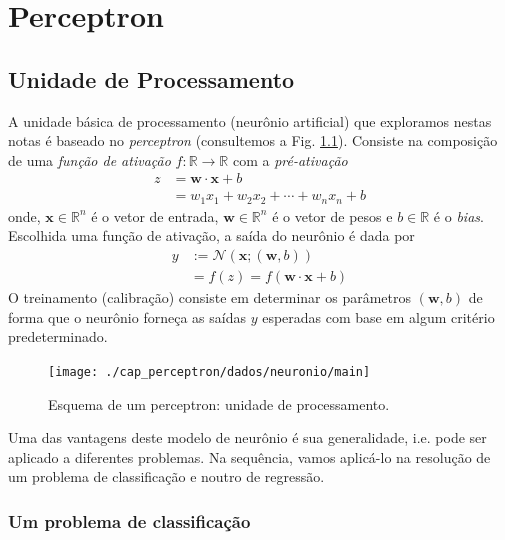 
\chapter{Perceptron}\label{cap_perceptron}
\thispagestyle{fancy}


\section{Unidade de Processamento}

A unidade básica de processamento (neurônio artificial) que exploramos nestas notas é baseado no \emph{perceptron} (consultemos a Fig. \ref{fig:perceptron}). Consiste na composição de uma \emph{função de ativação} $f:\mathbb{R}\to\mathbb{R}$ com a \emph{pré-ativação}
\begin{align}
  z &= \pmb{w}\cdot\pmb{x} + b\\
    &= w_1x_1 + w_2x_2 + \cdots + w_nx_n + b
\end{align}
onde, $\pmb{x}\in\mathbb{R}^{n}$ é o vetor de entrada, $\pmb{w}\in\mathbb{R}^{n}$ é o vetor de pesos e $b\in\mathbb{R}$ é o {\it bias}. Escolhida uma função de ativação, a saída do neurônio é dada por
\begin{align}
  y &:= \mathcal{N}\left(\pmb{x};(\pmb{w},b)\right)\\
    &= f(z) = f(\pmb{w}\cdot\pmb{x} + b)
\end{align}
O treinamento (calibração) consiste em determinar os parâmetros $(\pmb{w}, b)$ de forma que o neurônio forneça as saídas $y$ esperadas com base em algum critério predeterminado.

\begin{figure}[H]
  \centering
  \texttt{[image: ./cap\_perceptron/dados/neuronio/main]}
  \caption{Esquema de um perceptron: unidade de processamento.}
  \label{fig:perceptron}
\end{figure}

Uma das vantagens deste modelo de neurônio é sua generalidade, i.e. pode ser aplicado a diferentes problemas. Na sequência, vamos aplicá-lo na resolução de um problema de classificação e noutro de regressão.


\subsection{Um problema de classificação}

